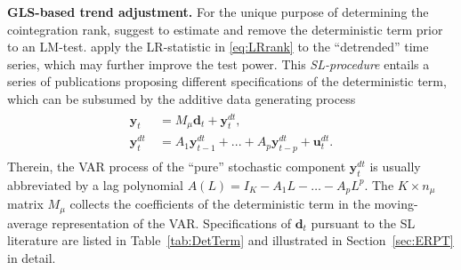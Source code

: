 \textbf{GLS-based trend adjustment.} For the unique purpose of determining the cointegration rank, \citet{SaikkonenLutkepohl2000a} suggest to estimate and remove the deterministic term prior to an LM-test. \citet{SaikkonenLutkepohl2000c} apply the LR-statistic in \eqref{eq:LRrank} to the ``detrended'' time series, which may further improve the test power. This \textit{SL-procedure} entails a series of publications proposing different specifications of the deterministic term, which can be subsumed by the additive data generating process 
\begin{align} \label{eq:addDGP}
\begin{split}
	\boldsymbol{y}_{t} \ & = M_\mu \boldsymbol{d}_t + \boldsymbol{y}^{d \! t}_{t}, \\
	\boldsymbol{y}^{d \! t}_{t} \ & = A_{1} \boldsymbol{y}^{d \! t}_{t-1} + ... + A_{p} \boldsymbol{y}^{d \! t}_{t-p} + \boldsymbol{u}^{d \! t}_{t}.
\end{split}
\end{align}
Therein, the VAR process of the ``pure'' stochastic component $ \boldsymbol{y}^{d \! t}_{t} $ is usually abbreviated by a lag polynomial $ A(L) = I_K - A_1 L - \ldots - A_p L^p $. The $ K \times n_\mu $ matrix $ M_\mu $ collects the coefficients of the deterministic term in the moving-average representation of the VAR. Specifications of $ \boldsymbol{d}_t $ pursuant to the SL literature are listed in Table~\ref{tab:DetTerm} and illustrated in Section~\ref{sec:ERPT} in detail.

